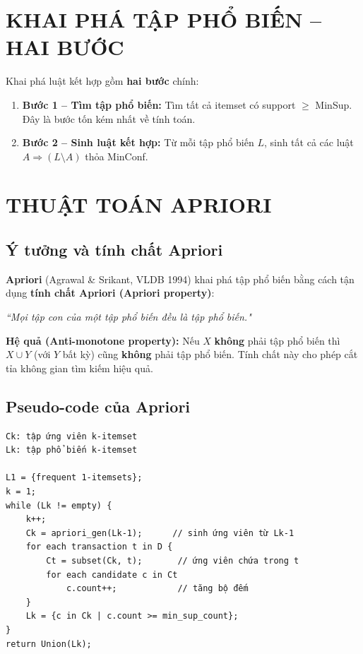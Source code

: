 \documentclass[10pt]{article}
\begin{document}
\section{KHAI PHÁ TẬP PHỔ BIẾN -- HAI BƯỚC}

Khai phá luật kết hợp gồm \textbf{hai bước} chính:
\begin{enumerate}
    \item \textbf{Bước 1 -- Tìm tập phổ biến:} Tìm tất cả itemset có support $\geq$ MinSup. Đây là bước tốn kém nhất về tính toán.
    \item \textbf{Bước 2 -- Sinh luật kết hợp:} Từ mỗi tập phổ biến $L$, sinh tất cả các luật $A \Rightarrow (L \setminus A)$ thỏa MinConf.
\end{enumerate}

\section{THUẬT TOÁN APRIORI}

\subsection{Ý tưởng và tính chất Apriori}

\textbf{Apriori} (Agrawal \& Srikant, VLDB 1994) khai phá tập phổ biến bằng cách tận dụng \textbf{tính chất Apriori (Apriori property)}:

\begin{center}
\textit{``Mọi tập con của một tập phổ biến đều là tập phổ biến."}
\end{center}

\textbf{Hệ quả (Anti-monotone property):} Nếu $X$ \textbf{không} phải tập phổ biến thì $X \cup Y$ (với $Y$ bất kỳ) cũng \textbf{không} phải tập phổ biến. Tính chất này cho phép cắt tỉa không gian tìm kiếm hiệu quả.

\subsection{Pseudo-code của Apriori}

\begin{singlespace}
\begin{verbatim}
Ck: tập ứng viên k-itemset
Lk: tập phổ biến k-itemset

L1 = {frequent 1-itemsets};
k = 1;
while (Lk != empty) {
    k++;
    Ck = apriori_gen(Lk-1);      // sinh ứng viên từ Lk-1
    for each transaction t in D {
        Ct = subset(Ck, t);       // ứng viên chứa trong t
        for each candidate c in Ct
            c.count++;            // tăng bộ đếm
    }
    Lk = {c in Ck | c.count >= min_sup_count};
}
return Union(Lk);
\end{verbatim}
\end{singlespace}
\end{document}
